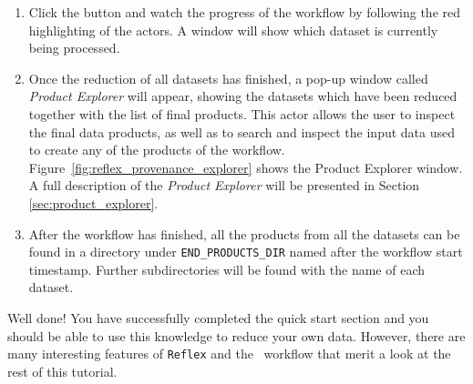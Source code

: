 \begin{enumerate}
  \item Click the  button and watch the progress of
    the workflow by following the red highlighting of the actors. A
    window will show which dataset is currently being processed.

\ifdefined \instquickitemlist 
  
\fi

\item Once the reduction of all datasets has finished, a pop-up window
  called {\sl Product Explorer} will appear, showing the datasets
  which have been reduced together with the list of final products.
  This actor allows the user to inspect the final data products, as
  well as to search and inspect the input data used to create any of
  the products of the workflow.
  Figure~\ref{fig:reflex_provenance_explorer} shows the Product
  Explorer window.  A full description of the {\sl Product Explorer}
  will be presented in Section \ref{sec:product_explorer}.

\item After the workflow has finished, all the products from all the
  datasets can be found in a directory under {\tt END\_PRODUCTS\_DIR}
  named after the workflow start timestamp. Further subdirectories
  will be found with the name of each dataset.

\end{enumerate}

Well done! You have successfully completed the quick start section and
you should be able to use this knowledge to reduce your own
data. However, there are many interesting features of {\tt Reflex} and
the \instname\, workflow that merit a look at the rest of this tutorial.

